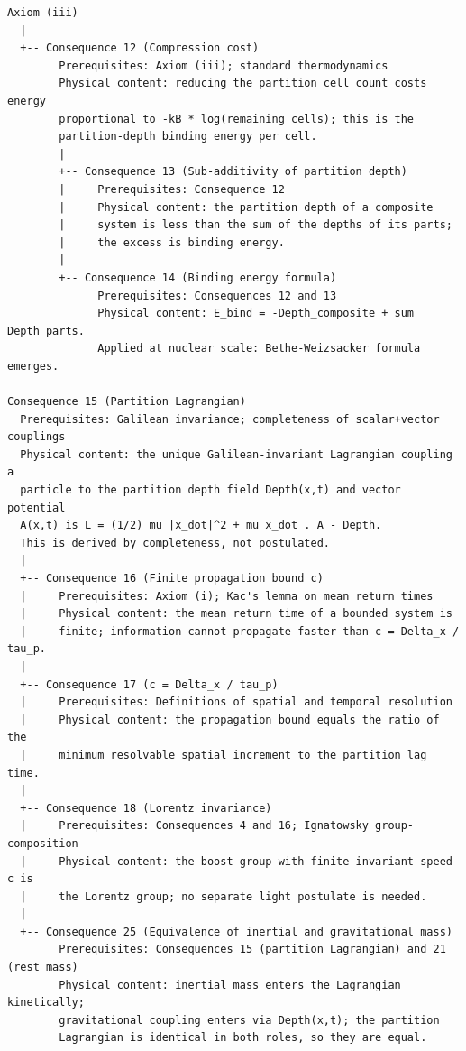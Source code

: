 \begin{center}
\small\ttfamily
\begin{verbatim}
Axiom (iii)
  |
  +-- Consequence 12 (Compression cost)
        Prerequisites: Axiom (iii); standard thermodynamics
        Physical content: reducing the partition cell count costs energy
        proportional to -kB * log(remaining cells); this is the
        partition-depth binding energy per cell.
        |
        +-- Consequence 13 (Sub-additivity of partition depth)
        |     Prerequisites: Consequence 12
        |     Physical content: the partition depth of a composite
        |     system is less than the sum of the depths of its parts;
        |     the excess is binding energy.
        |
        +-- Consequence 14 (Binding energy formula)
              Prerequisites: Consequences 12 and 13
              Physical content: E_bind = -Depth_composite + sum Depth_parts.
              Applied at nuclear scale: Bethe-Weizsacker formula emerges.

Consequence 15 (Partition Lagrangian)
  Prerequisites: Galilean invariance; completeness of scalar+vector couplings
  Physical content: the unique Galilean-invariant Lagrangian coupling a
  particle to the partition depth field Depth(x,t) and vector potential
  A(x,t) is L = (1/2) mu |x_dot|^2 + mu x_dot . A - Depth.
  This is derived by completeness, not postulated.
  |
  +-- Consequence 16 (Finite propagation bound c)
  |     Prerequisites: Axiom (i); Kac's lemma on mean return times
  |     Physical content: the mean return time of a bounded system is
  |     finite; information cannot propagate faster than c = Delta_x / tau_p.
  |
  +-- Consequence 17 (c = Delta_x / tau_p)
  |     Prerequisites: Definitions of spatial and temporal resolution
  |     Physical content: the propagation bound equals the ratio of the
  |     minimum resolvable spatial increment to the partition lag time.
  |
  +-- Consequence 18 (Lorentz invariance)
  |     Prerequisites: Consequences 4 and 16; Ignatowsky group-composition
  |     Physical content: the boost group with finite invariant speed c is
  |     the Lorentz group; no separate light postulate is needed.
  |
  +-- Consequence 25 (Equivalence of inertial and gravitational mass)
        Prerequisites: Consequences 15 (partition Lagrangian) and 21 (rest mass)
        Physical content: inertial mass enters the Lagrangian kinetically;
        gravitational coupling enters via Depth(x,t); the partition
        Lagrangian is identical in both roles, so they are equal.
\end{verbatim}
\end{center}

